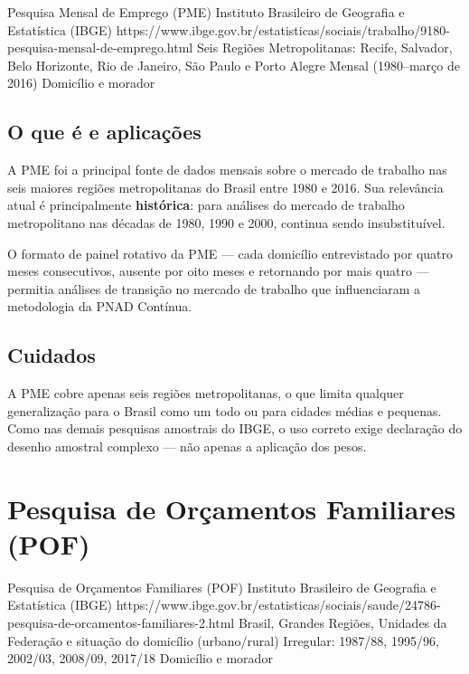 \ficharapida
  {Pesquisa Mensal de Emprego (PME)}
  {Instituto Brasileiro de Geografia e Estatística (IBGE)}
  {https://www.ibge.gov.br/estatisticas/sociais/trabalho/9180-pesquisa-mensal-de-emprego.html}
  {Seis Regiões Metropolitanas: Recife, Salvador, Belo Horizonte, Rio de Janeiro, São Paulo e Porto Alegre}
  {Mensal (1980--março de 2016)}
  {Domicílio e morador}

\subsection{O que é e aplicações}

A PME foi a principal fonte de dados mensais sobre o mercado de trabalho nas seis maiores regiões metropolitanas do Brasil entre 1980 e 2016. Sua relevância atual é principalmente \textbf{histórica}: para análises do mercado de trabalho metropolitano nas décadas de 1980, 1990 e 2000, continua sendo insubstituível.

O formato de painel rotativo da PME --- cada domicílio entrevistado por quatro meses consecutivos, ausente por oito meses e retornando por mais quatro --- permitia análises de transição no mercado de trabalho que influenciaram a metodologia da PNAD Contínua.

\subsection{Cuidados}

A PME cobre apenas seis regiões metropolitanas, o que limita qualquer generalização para o Brasil como um todo ou para cidades médias e pequenas. Como nas demais pesquisas amostrais do IBGE, o uso correto exige declaração do desenho amostral complexo --- não apenas a aplicação dos pesos.

\section{Pesquisa de Orçamentos Familiares (POF)}

\ficharapida
  {Pesquisa de Orçamentos Familiares (POF)}
  {Instituto Brasileiro de Geografia e Estatística (IBGE)}
  {https://www.ibge.gov.br/estatisticas/sociais/saude/24786-pesquisa-de-orcamentos-familiares-2.html}
  {Brasil, Grandes Regiões, Unidades da Federação e situação do domicílio (urbano/rural)}
  {Irregular: 1987/88, 1995/96, 2002/03, 2008/09, 2017/18}
  {Domicílio e morador}

